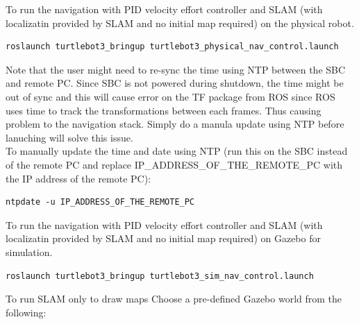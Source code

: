 \documentclass[12]{article}
\begin{document}
To run the navigation with PID velocity effort controller and SLAM (with localizatin provided by SLAM and no initial map required) on the physical robot. 
\begin{lstlisting}[style=bash]
roslaunch turtlebot3_bringup turtlebot3_physical_nav_control.launch 
\end{lstlisting}

Note that the user might need to re-sync the time using NTP between the SBC and remote PC. Since SBC is not powered during shutdown, 
the time might be out of sync and this will cause error on the TF package from ROS since ROS uses time to track the transformations between each frames. Thus causing problem to the navigation stack. 
Simply do a manula update using NTP before lanuching will solve this issue.\\
To manually update the time and date using NTP (run this on the SBC instead of the remote PC and replace IP\_ADDRESS\_OF\_THE\_REMOTE\_PC with the IP address of the remote PC):

\begin{lstlisting}[style=bash]
    ntpdate -u IP_ADDRESS_OF_THE_REMOTE_PC
\end{lstlisting}

To run the navigation with PID velocity effort controller and SLAM (with localizatin provided by SLAM and no initial map required) on Gazebo for simulation.  
\begin{lstlisting}[style=bash]
roslaunch turtlebot3_bringup turtlebot3_sim_nav_control.launch 
\end{lstlisting}

To run SLAM only to draw maps
Choose a pre-defined Gazebo world from the following:
\end{document}
